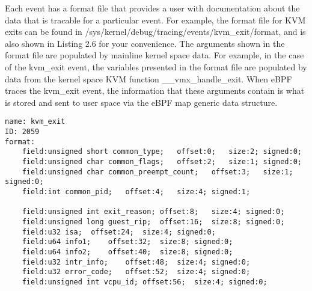 \documentclass{report}
\begin{document}
\begin{spacing}{1.5}
{\large
Each event has a format file that provides a user with documentation about the data that is tracable for a particular event. For example, the format file for KVM exits can be found in /sys/kernel/debug/tracing/events/kvm\_exit/format, and is also shown in Listing 2.6 for your convenience. The arguments shown in the format file are populated by mainline kernel space data. For example, in the case of the kvm\_exit event, the variables presented in the format file are populated by data from the kernel space KVM function \_\_vmx\_handle\_exit. When eBPF traces the kvm\_exit event, the information that these arguments contain is what is stored and sent to user space via the eBPF map generic data structure.
\newline

\leavevmode\newline

\begin{lstlisting}[caption={Format File for the kvm\_exit Linux Kernel Tracepoint Event | Linux kernel V5.18.8},captionpos=b]
name: kvm_exit
ID: 2059
format:
    field:unsigned short common_type;   offset:0;   size:2; signed:0;
    field:unsigned char common_flags;   offset:2;   size:1; signed:0;
    field:unsigned char common_preempt_count;   offset:3;   size:1; signed:0;
    field:int common_pid;   offset:4;   size:4; signed:1;

    field:unsigned int exit_reason; offset:8;   size:4; signed:0;
    field:unsigned long guest_rip;  offset:16;  size:8; signed:0;
    field:u32 isa;  offset:24;  size:4; signed:0;
    field:u64 info1;    offset:32;  size:8; signed:0;
    field:u64 info2;    offset:40;  size:8; signed:0;
    field:u32 intr_info;    offset:48;  size:4; signed:0;
    field:u32 error_code;   offset:52;  size:4; signed:0;
    field:unsigned int vcpu_id; offset:56;  size:4; signed:0;
\end{lstlisting}
}






\end{spacing}
\end{document}

